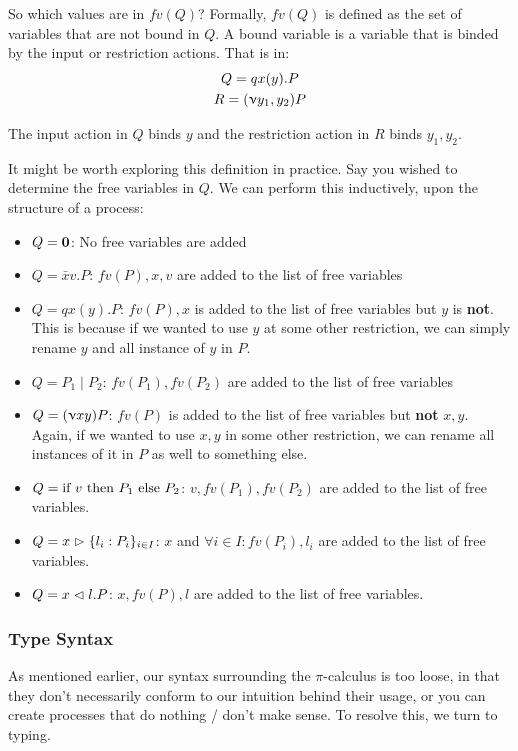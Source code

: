 
So which values are in $fv(Q)$? Formally, $fv(Q)$ is defined as the set of variables that are not bound in $Q$. A bound variable is a variable that is binded by the input or restriction actions. That is in:
\begin{gather*}
Q = qx(y).P \\
R = (\upnu y_1, y_2) P
\end{gather*}

The input action in $Q$ binds $y$ and the restriction action in $R$ binds $y_1, y_2$.

It might be worth exploring this definition in practice. Say you wished to determine the free variables in $Q$. We can perform this inductively, upon the structure of a process:

\begin{itemize}
    \item $Q = \textbf{0}$: No free variables are added
    \item $Q = \bar{x}v.P$: $fv(P), x,v$ are added to the list of free variables
    \item $Q = q x(y).P$: $fv(P), x$ is added to the list of free variables but $y$ is \textbf{not}. This is because if we wanted to use $y$ at some other restriction, we can simply rename $y$ and all instance of $y$ in $P$.
    \item $Q = P_1 \mid P_2$: $fv(P_1), fv(P_2)$ are added to the list of free variables
    \item $Q = (\upnu xy)P$: $fv(P)$ is added to the list of free variables but \textbf{not} $x,y$. Again, if we wanted to use $x,y$ in some other restriction, we can rename all instances of it in $P$ as well to something else.
    \item $Q = \text{if } v \text{ then } P_1 \text{ else } P_2$: $v,fv(P_1), fv(P_2)$ are added to the list of free variables.
    \item $Q = x \vartriangleright \{l_i : P_i\}_{i \in I}$: $x$ and $\forall i \in I: fv(P_i), l_i$ are added to the list of free variables.
    \item $Q = x \vartriangleleft l.P$: $x, fv(P), l$ are added to the list of free variables.
\end{itemize}

\subsubsection{Type Syntax}
As mentioned earlier, our syntax surrounding the $\pi$-calculus is too loose, in that they don't necessarily conform to our intuition behind their usage, or you can create processes that do nothing / don't make sense. To resolve this, we turn to typing.

